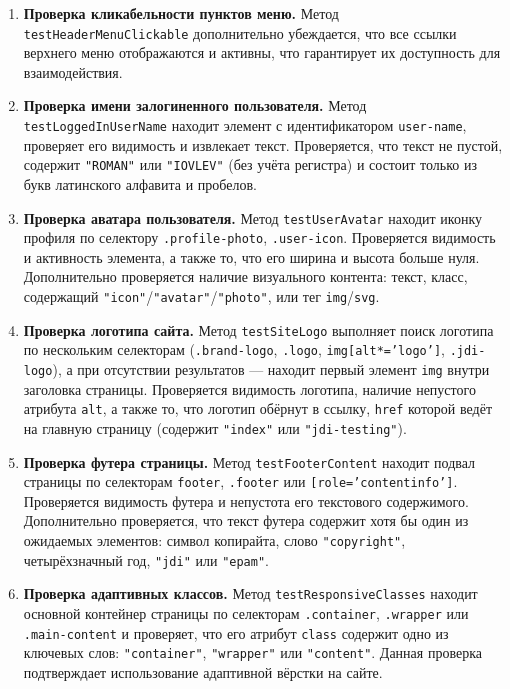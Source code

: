 \documentclass{article}[14pt]
\begin{document}
\begin{enumerate}
\item \textbf{Проверка кликабельности пунктов меню.} Метод \texttt{testHeaderMenuClickable} дополнительно убеждается, что все ссылки верхнего меню отображаются и активны, что гарантирует их доступность для взаимодействия.

\item \textbf{Проверка имени залогиненного пользователя.} Метод \texttt{testLoggedInUserName} находит элемент с идентификатором \texttt{user-name}, проверяет его видимость и извлекает текст. Проверяется, что текст не пустой, содержит \texttt{"ROMAN"} или \texttt{"IOVLEV"} (без учёта регистра) и состоит только из букв латинского алфавита и пробелов.

\item \textbf{Проверка аватара пользователя.} Метод \texttt{testUserAvatar} находит иконку профиля по селектору \texttt{.profile-photo}, \texttt{.user-icon}. Проверяется видимость и активность элемента, а также то, что его ширина и высота больше нуля. Дополнительно проверяется наличие визуального контента: текст, класс, содержащий \texttt{"icon"}/\texttt{"avatar"}/\texttt{"photo"}, или тег \texttt{img}/\texttt{svg}.

\item \textbf{Проверка логотипа сайта.} Метод \texttt{testSiteLogo} выполняет поиск логотипа по нескольким селекторам (\texttt{.brand-logo}, \texttt{.logo}, \texttt{img[alt*='logo']}, \texttt{.jdi-logo}), а при отсутствии результатов — находит первый элемент \texttt{img} внутри заголовка страницы. Проверяется видимость логотипа, наличие непустого атрибута \texttt{alt}, а также то, что логотип обёрнут в ссылку, \texttt{href} которой ведёт на главную страницу (содержит \texttt{"index"} или \texttt{"jdi-testing"}).

\item \textbf{Проверка футера страницы.} Метод \texttt{testFooterContent} находит подвал страницы по селекторам \texttt{footer}, \texttt{.footer} или \texttt{[role='contentinfo']}. Проверяется видимость футера и непустота его текстового содержимого. Дополнительно проверяется, что текст футера содержит хотя бы один из ожидаемых элементов: символ копирайта, слово \texttt{"copyright"}, четырёхзначный год, \texttt{"jdi"} или \texttt{"epam"}.

\item \textbf{Проверка адаптивных классов.} Метод \texttt{testResponsiveClasses} находит основной контейнер страницы по селекторам \texttt{.container}, \texttt{.wrapper} или \texttt{.main-content} и проверяет, что его атрибут \texttt{class} содержит одно из ключевых слов: \texttt{"container"}, \texttt{"wrapper"} или \texttt{"content"}. Данная проверка подтверждает использование адаптивной вёрстки на сайте.

\end{enumerate}
\end{document}
